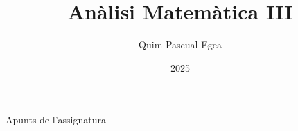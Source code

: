 \documentclass[12pt]{book}
\author{Quim Pascual Egea}
\title{Anàlisi Matemàtica III}
\date{2025}
\theoremstyle{definition}
\theoremstyle{nota}
\theoremstyle{exemple}
\begin{document}
\makeatletter
\begin{titlepage}
  \noindent\Huge
  \begin{center}
    \textbf{\@title}
  \end{center}
  \vfill

  \noindent\large\sffamily
  Apunts de l'assignatura
  \hfill
  \@author
\end{titlepage}
\makeatother


\tableofcontents



\end{document}
